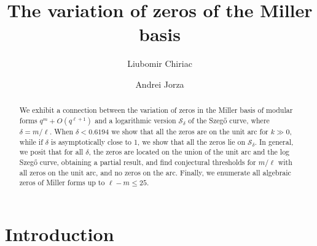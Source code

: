 \documentclass[12pt]{amsart}
\title{The variation of zeros of the Miller basis}
\author{Liubomir Chiriac\and Andrei Jorza}
\date{}
\theoremstyle{plain} %
\theoremstyle{definition}
\theoremstyle{remark}
\numberwithin{equation}{section}
\newcommand{\Z}{\mathbb Z}
\newcommand{\C}{\mathbb C}
\newcommand{\h}{\mathfrak{H}}
\newcommand{\SL}{\operatorname{SL}}
\begin{document}
\maketitle
\begin{abstract}
We exhibit a connection between the variation of zeros in the Miller basis of modular forms $q^m+O(q^{\ell+1})$ and a logarithmic version $\mathcal{S}_\delta$ of the Szeg\H{o} curve, where $\delta=m/\ell$. When $\delta<0.6194$ we show that all the zeros are on the unit arc for $k\gg 0$, while if $\delta$ is asymptotically close to 1, we show that all the zeros lie on $\mathcal{S}_{\delta}$. In general, we posit that for all $\delta$, the zeros are located on the union of the unit arc and the log Szeg\H{o} curve, obtaining a partial result, and find conjectural thresholds for $m/\ell$ with all zeros on the unit arc, and no zeros on the arc. Finally, we enumerate all algebraic zeros of Miller forms up to $\ell-m\leq 25$. 
\end{abstract}

\section{Introduction}
\end{document}
